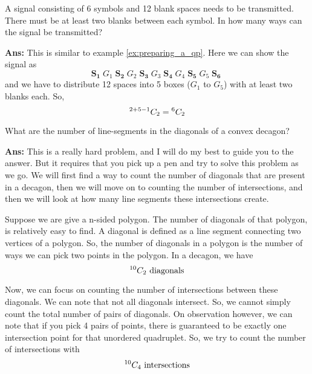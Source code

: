 \begin{example}
    A signal consisting of 6 symbols and 12 blank spaces needs to be transmitted. There must be at least two blanks between each symbol. In how many ways can the signal be transmitted?

    \textbf{Ans:} This is similar to example \ref{ex:preparing_a_qp}. Here we can show the signal as
    \[
        \mathbf{S_1}\; G_1 \;\mathbf{S_2}\;G_2\;\mathbf{S_3}\;G_3\;\mathbf{S_4}\;G_4\;\mathbf{S_5}\;G_5\;\mathbf{S_6}\;
    \]
    and we have to distribute 12 spaces into 5 boxes (\mbox{$G_1$} to \mbox{$G_5$}) with at least two blanks each. So,
    \[
        {}^{2+5-1}C_{2} = {}^{6}C_{2}
    \]
\end{example}

\begin{case_study}
    What are the number of line-segments in the diagonals of a convex decagon?

    \textbf{Ans:} This is a really hard problem, and I will do my best to guide you to the answer. But it requires that you pick up a pen and try to solve this problem as we go. We will first find a way to count the number of diagonals that are present in a decagon, then we will move on to counting the number of intersections, and then we will look at how many line segments these intersections create.

    Suppose we are give a n-sided polygon. The number of diagonals of that polygon, is relatively easy to find. A diagonal is defined as a line segment connecting two vertices of a polygon. So, the number of diagonals in a polygon is the number of ways we can pick two points in the polygon. In a decagon, we have
    \[
        {}^{10}C_{2} \text{ diagonals}
    \]

    Now, we can focus on counting the number of intersections between these diagonals. We can note that not all diagonals intersect. So, we cannot simply count the total number of pairs of diagonals. On observation however, we can note that if you pick 4 pairs of points, there is guaranteed to be exactly one intersection point for that unordered quadruplet. So, we try to count the number of intersections with
    \[
        {}^{10}C_{4} \text{ intersections}
    \]


\end{case_study}
